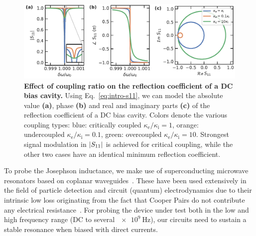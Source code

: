 \begin{figure}[t]
	\centering
	\includegraphics[width=\linewidth]{chapter-introduction/figs/model_DC_bias_cavity_coupling.pdf}
	\caption{
		\textbf{Effect of coupling ratio on the reflection coefficient of a DC bias cavity.}
		Using Eq.~\ref{eq:intro-s11}, we can model the absolute value \textbf{(a)}, phase \textbf{(b)} and real and imaginary parts \textbf{(c)} of the reflection coefficient of a DC bias cavity.
		Colors denote the various coupling types: blue: critically coupled $\kappa_\text{e}/\kappa_\text{i}=1$, orange: undercoupled $\kappa_\text{e}/\kappa_\text{i}=0.1$, green: overcoupled $\kappa_\text{e}/\kappa_\text{i}=10$.
		Strongest signal modulation in $\lvert S_{11}\rvert$ is achieved for critical coupling, while the other two cases have an identical minimum reflection coefficient.
	}
	\label{fig:s11}
\end{figure}


To probe the Josephson inductance, we make use of superconducting microwave resonators based on coplanar waveguides~\cite{gopplCoplanarWaveguideResonators2008,zmuidzinasSuperconductingMicroresonatorsPhysics2012}.
%
These have been used extensively in the field of particle detection and circuit (quantum) electrodynamics due to their intrinsic low loss originating from the fact that Cooper Pairs do not contribute any electrical resistance~\cite{dayBroadbandSuperconductingDetector2003a,blaisCavityQuantumElectrodynamics2004c,clerkHybridQuantumSystems2020,blaisQuantumInformationProcessing2020}.
%
For probing the device under test both in the low and high frequency range (DC to several $\SI{e9}{\hertz}$), our circuits need to sustain a stable resonance when biased with direct currents.

